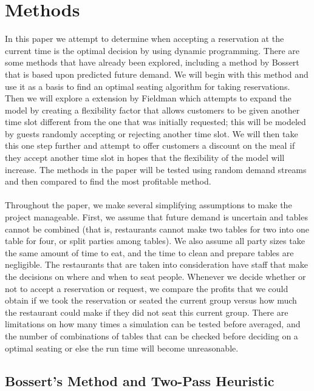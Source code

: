 \documentclass[12pt, titlepage]{article}
\begin{document}
\section{Methods}

In this paper we attempt to determine when accepting a reservation at the current time is the optimal decision by using dynamic programming. There are some methods that have already been explored, including a method by Bossert that is based upon predicted future demand. We will begin with this method and use it as a basis to find an optimal seating algorithm for taking reservations. Then we will explore a extension by Fieldman which attempts to expand the model by creating a flexibility factor that allows customers to be given another time slot different from the one that was initially requested; this will be modeled by guests randomly accepting or rejecting another time slot. We will then take this one step further and attempt to offer customers a discount on the meal if they accept another time slot in hopes that the flexibility of the model will increase. The methods in the paper will be tested using random demand streams and then compared to find the most profitable method.\\
 \\
Throughout the paper, we make several simplifying assumptions to make the project manageable. First, we assume that future demand is uncertain and tables cannot be combined (that is, restaurants cannot make two tables for two into one table for four, or split parties among tables). We also assume all party sizes take the same amount of time to eat, and the time to clean and prepare tables are negligible. The restaurants that are taken into consideration have staff that make the decisions on where and when to seat people. Whenever we decide whether or not to accept a reservation or request, we compare the profits that we could obtain if we took the reservation or seated the current group versus how much the restaurant could make if they did not seat this current group. There are limitations on how many times a simulation can be tested before averaged, and the number of combinations of tables that can be checked before deciding on a optimal seating or else the run time will become unreasonable.


\subsection{Bossert's Method and Two-Pass Heuristic }
\end{document}
